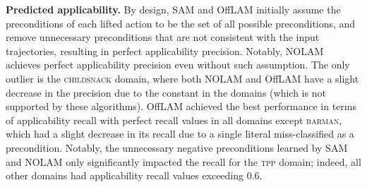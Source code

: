 \documentclass{article}
\newcommand{\miniparagraph}[1]{\textbf{#1.}}
\theoremstyle{definition}
\theoremstyle{remark}
\newcommand{\nolam}{NOLAM\xspace}
\newcommand{\offlam}{OffLAM\xspace}
\newcommand{\samshort}{SAM}
\newif\ifaddcomments
\newcommand{\roni}[1]{\ifaddcomments{\textcolor{red}{[Roni: #1]}}\fi}
\newcommand{\leo}[1]{\ifaddcomments{\textcolor{pink}{[Leonardo: #1]}}\fi}
\begin{document}
\miniparagraph{Predicted applicability} 
By design, \samshort{} and \offlam{} initially assume the preconditions of each lifted action to be the set of all possible preconditions, and remove unnecessary preconditions that are not consistent with the input trajectories, resulting in perfect applicability precision. Notably, \nolam{} achieves perfect applicability precision even without such assumption.
The only outlier is the \textsc{childsnack} domain, where both \nolam{} and \offlam{} have a slight decrease in the precision due to the constant in the domains (which is not supported by these algorithms).
\offlam{} achieved the best performance in terms of applicability recall with perfect recall values in all domains except \textsc{barman}, which had a slight decrease in its recall due to a single literal miss-classified as a precondition. 
Notably, the unnecessary negative preconditions learned by \samshort{} and \nolam{} only significantly impacted the recall for the \textsc{tpp} domain; indeed, all other domains had applicability recall values exceeding $0.6$. 
\end{document}
